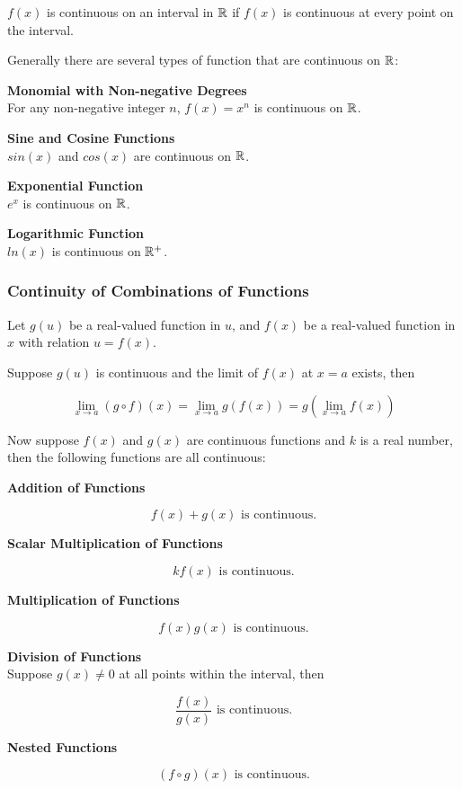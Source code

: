 \documentclass[a4paper,12pt]{article}
\begin{document}
$f(x)$ is continuous on an interval in $\mathbb{R}$ if $f(x)$ is continuous at every point on the interval.\n

Generally there are several types of function that are continuous on $\mathbb{R}$:
\begin{alist}
  \item \textbf{Monomial with Non-negative Degrees}\\
  For any non-negative integer $n$, $f(x)=x^{n}$ is continuous on $\mathbb{R}$.
  \item \textbf{Sine and Cosine Functions}\\
  $sin(x)$ and $cos(x)$ are continuous on $\mathbb{R}$.
  \item \textbf{Exponential Function}\\
  $e^{x}$ is continuous on $\mathbb{R}$.
  \item \textbf{Logarithmic Function}\\
  $ln(x)$ is continuous on $\mathbb{R}^{+}$.
\end{alist}

\subsubsection{Continuity of Combinations of Functions}
\begin{thm}
  Let $g(u)$ be a real-valued function in $u$, and $f(x)$ be a real-valued function in $x$ with relation $u=f(x)$.\n

  Suppose $g(u)$ is continuous and the limit of $f(x)$ at $x=a$ exists, then

  $$\lim_{x\to a}(g\circ f)(x)=\lim_{x\to a}g(f(x))=g(\lim_{x\to a}f(x))$$
\end{thm}\n

Now suppose $f(x)$ and $g(x)$ are continuous functions and $k$ is a real number, then the following functions are all continuous:

\begin{alist}
  \item \textbf{Addition of Functions}

  $$f(x)+g(x)\text{ is continuous.}$$

  \item \textbf{Scalar Multiplication of Functions}

  $$kf(x)\text{ is continuous.}$$

  \item \textbf{Multiplication of Functions}

  $$f(x)g(x)\text{ is continuous.}$$

  \item \textbf{Division of Functions}\\
  Suppose $g(x)\neq 0$ at all points within the interval, then

  $$\frac{f(x)}{g(x)}\text{ is continuous.}$$

  \item \textbf{Nested Functions}

  $$(f\circ g)(x)\text{ is continuous.}$$
\end{alist}
\end{document}
